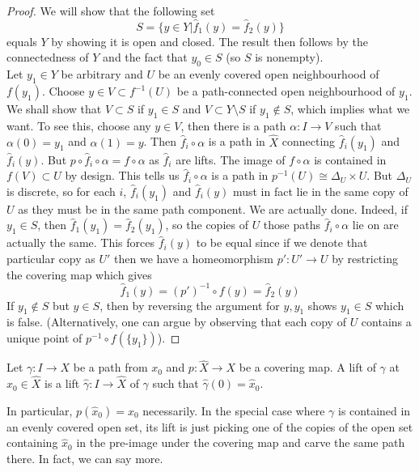 \begin{proof}
    We will show that the following set
    $$S=\{y\in Y|\hat{f}_1(y)=\hat{f}_2(y)\}$$
    equals $Y$ by showing it is open and closed.
    The result then follows by the connectedness of $Y$ and the fact that $y_0\in S$ (so $S$ is nonempty).\\
    Let $y_1\in Y$ be arbitrary and $U$ be an evenly covered open neighbourhood of $f(y_1)$.
    Choose $y\in V\subset f^{-1}(U)$ be a path-connected open neighbourhood of $y_1$.
    We shall show that $V\subset S$ if $y_1\in S$ and $V\subset Y\setminus S$ if $y_1\notin S$, which implies what we want.
    To see this, choose any $y\in V$, then there is a path $\alpha:I\to V$ such that $\alpha(0)=y_1$ and $\alpha(1)=y$.
    Then $\hat{f}_i\circ\alpha$ is a path in $\hat{X}$ connecting $\hat{f}_i(y_1)$ and $\hat{f}_i(y)$.
    But $p\circ\hat{f}_i\circ\alpha=f\circ\alpha$ as $\hat{f}_i$ are lifts.
    The image of $f\circ\alpha$ is contained in $f(V)\subset U$ by design.
    This tells us $\hat{f}_i\circ\alpha$ is a path in $p^{-1}(U)\cong\Delta_U\times U$.
    But $\Delta_U$ is discrete, so for each $i$, $\hat{f}_i(y_1)$ and $\hat{f}_i(y)$ must in fact lie in the same copy of $U$ as they must be in the same path component.
    We are actually done.
    Indeed, if $y_1\in S$, then $\hat{f}_1(y_1)=\hat{f}_2(y_1)$, so the copies of $U$ those paths $\hat{f}_i\circ\alpha$ lie on are actually the same.
    This forces $\hat{f}_i(y)$ to be equal since if we denote that particular copy as $U'$ then we have a homeomorphism $p':U'\to U$ by restricting the covering map which gives
    $$\hat{f}_1(y)=(p')^{-1}\circ f(y)=\hat{f}_2(y)$$
    If $y_1\notin S$ but $y\in S$, then by reversing the argument for $y,y_1$ shows $y_1\in S$ which is false.
    (Alternatively, one can argue by observing that each copy of $U$ contains a unique point of $p^{-1}\circ f(\{y_1\})$).
\end{proof}
\begin{definition}
    Let $\gamma:I\to X$ be a path from $x_0$ and $p:\hat{X}\to X$ be a covering map.
    A lift of $\gamma$ at $\hat{x}_0\in\hat{X}$ is a lift $\hat{\gamma}:I\to\hat{X}$ of $\gamma$ such that $\hat{\gamma}(0)=\hat{x}_0$.
\end{definition}
In particular, $p(\hat{x}_0)=x_0$ necessarily.
In the special case where $\gamma$ is contained in an evenly covered open set, its lift is just picking one of the copies of the open set containing $\hat{x}_0$ in the pre-image under the covering map and carve the same path there.
In fact, we can say more.
